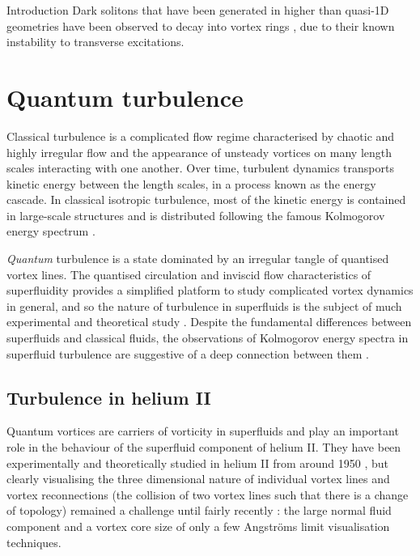 \begin{chapter}{\label{cha:bose_gases}Introduction}
Dark solitons that have been generated in higher than quasi-1D geometries have been observed to decay into vortex rings \cite{PhysRevLett.86.2926,Dutton27072001,Shomroni09}, due to their known instability to transverse excitations.


\section{Quantum turbulence}
Classical turbulence is a complicated flow regime characterised by chaotic and highly irregular flow and the appearance of unsteady vortices on many length scales interacting with one another. Over time, turbulent dynamics transports kinetic energy between the length scales, in a process known as the energy cascade. In classical isotropic turbulence, most of the kinetic energy is contained in large-scale structures and is distributed following the famous Kolmogorov energy spectrum \cite{davidson2004turbulence}.

{\it Quantum} turbulence is a state dominated by an irregular tangle of quantised vortex lines. The quantised circulation and inviscid flow characteristics of superfluidity provides a simplified platform to study complicated vortex dynamics in general, and so the nature of turbulence in superfluids is the subject of much experimental and theoretical study \cite{Bradley11,skebek12,PhysRevLett.110.014502,barenghi_skrbek_14,PhysRevLett.115.155303}. Despite the fundamental differences between superfluids and classical fluids, the observations of Kolmogorov energy spectra in superfluid turbulence are suggestive of a deep connection between them \cite{barenghi_skrbek_14}. 

\subsection{Turbulence in helium II}
Quantum vortices are carriers of vorticity in superfluids and play an important role in the behaviour of the superfluid component of helium II. They have been experimentally and theoretically studied in helium II from around 1950 \cite{Donnelly}, but clearly visualising the three dimensional nature of individual vortex lines and vortex reconnections (the collision of two vortex lines such that there is a change of topology) remained a challenge until fairly recently \cite{Bewley09,Fonda12}: the large normal fluid component and a vortex core size of only a few Angstr\"oms limit visualisation techniques.


\end{chapter}
